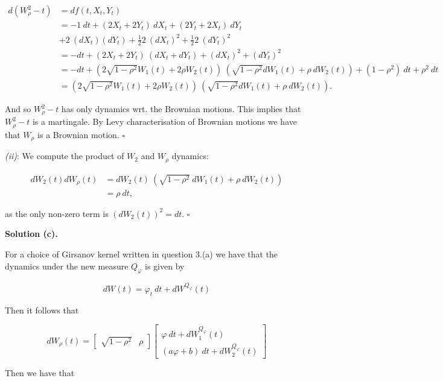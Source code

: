 \documentclass[
]{book}
\begin{document}
\begin{align*}
d(W_\rho^2-t)&=df(t,X_t,Y_t)\\
&=-1\ dt+(2X_t+2Y_t)\ dX_t+(2Y_t+2X_t)\ dY_t\\
&+2\ (dX_t)(dY_t)+\frac{1}{2}2\ (dX_t)^2+\frac{1}{2}2\ (dY_t)^2\\
&=-dt+(2X_t+2Y_t)\ (dX_t+dY_t)+(dX_t)^2+(dY_t)^2\\
&=-dt+\left(2\sqrt{1-\rho^2}W_1(t)+2\rho W_2(t)\right)\ \left(\sqrt{1-\rho^2}dW_1(t)+\rho\ dW_2(t)\right)+(1-\rho^2)\ dt+\rho^2\ dt\\
&=\left(2\sqrt{1-\rho^2}W_1(t)+2\rho W_2(t)\right)\ \left(\sqrt{1-\rho^2}dW_1(t)+\rho\ dW_2(t)\right).
\end{align*}

And so \(W_\rho^2-t\) has only dynamics wrt. the Brownian motions. This implies that \(W_\rho^2-t\) is a martingale. By Levy characterisation of Brownian motions we have that \(W_\rho\) is a Brownian motion. \(\square\)

\emph{(ii)}: We compute the product of \(W_2\) and \(W_\rho\) dynamics:

\begin{align*}
dW_2(t)dW_\rho(t)&=dW_2(t)\ \left(\sqrt{1-\rho^2}\ dW_1(t)+\rho\ dW_2(t)\right)\\
&=\rho\ dt,
\end{align*}

as the only non-zero term is \((dW_2(t))^2=dt\). \(\square\)

\noindent\makebox[\linewidth]{\rule{\textwidth}{0.4pt}}

\textbf{Solution (c).}

For a choice of Girsanov kernel written in question 3.(a) we have that the dynamics under the new measure \(Q_\varphi\) is given by

\[
dW(t)=\varphi_t\ dt+dW^{Q_\varphi}(t)
\]

Then it follows that

\[
dW_\rho(t)=
\begin{bmatrix}
\sqrt{1-\rho^2} & \rho
\end{bmatrix}
\begin{bmatrix}
\varphi\ dt+dW^{Q_\varphi}_1(t)\\
(a\varphi+b)\ dt+dW^{Q_\varphi}_2(t)
\end{bmatrix}
\]

Then we have that
\end{document}
